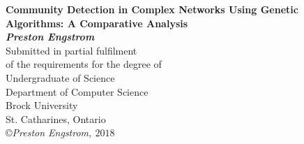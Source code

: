 \begin{titlepage}
\begin{center}

{\LARGE {\bf 
Community Detection in Complex Networks Using Genetic Algorithms: \linebreak 
A Comparative Analysis}}
\\[3cm]
{\large{ \bf \textit{Preston Engstrom}}}
\\[3cm]
{\large Submitted in partial fulfilment\\ of the requirements for the degree of\\ [1cm]
Undergraduate of Science}
\\[4cm]
{\large Department of Computer Science\\Brock University\\
St. Catharines, Ontario}
\\[5cm]
\copyright \textit{Preston Engstrom, $ 2018 $}

\end{center}
\end{titlepage}

  